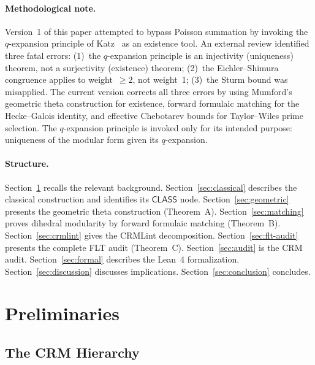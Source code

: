 \documentclass[11pt,a4paper]{article}
\theoremstyle{plain}
\theoremstyle{definition}
\newcommand{\CLASS}{\textsf{CLASS}}
\begin{document}
\paragraph{Methodological note.}
Version~1 of this paper attempted to bypass Poisson summation by invoking the $q$-expansion principle of Katz~\cite{katz73} as an existence tool.
An external review identified three fatal errors: (1)~the $q$-expansion principle is an injectivity (uniqueness) theorem, not a surjectivity (existence) theorem; (2)~the Eichler--Shimura congruence applies to weight~$\geq 2$, not weight~1; (3)~the Sturm bound was misapplied.
The current version corrects all three errors by using Mumford's geometric theta construction for existence, forward formulaic matching for the Hecke--Galois identity, and effective Chebotarev bounds for Taylor--Wiles prime selection.
The $q$-expansion principle is invoked only for its intended purpose: uniqueness of the modular form given its $q$-expansion.

\paragraph{Structure.}
Section~\ref{sec:prelim} recalls the relevant background.
Section~\ref{sec:classical} describes the classical construction and identifies its $\CLASS$ node.
Section~\ref{sec:geometric} presents the geometric theta construction (Theorem~A).
Section~\ref{sec:matching} proves dihedral modularity by forward formulaic matching (Theorem~B).
Section~\ref{sec:crmlint} gives the CRMLint decomposition.
Section~\ref{sec:flt-audit} presents the complete FLT audit (Theorem~C).
Section~\ref{sec:audit} is the CRM audit.
Section~\ref{sec:formal} describes the Lean~4 formalization.
Section~\ref{sec:discussion} discusses implications.
Section~\ref{sec:conclusion} concludes.


\section{Preliminaries}\label{sec:prelim}

\subsection{The CRM Hierarchy}
\end{document}

